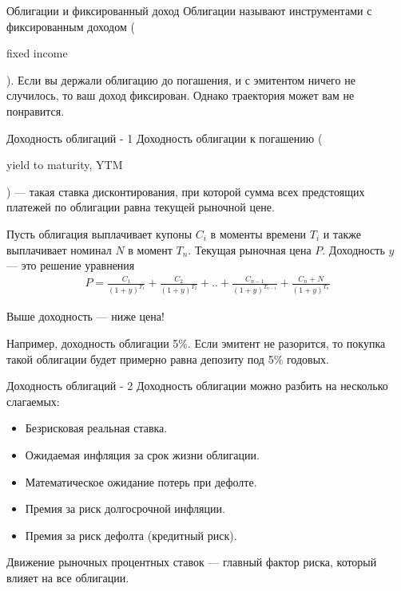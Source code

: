 \documentclass{beamer}
\newcommand{\en}[1]{\begin{otherlanguage}{english}#1\end{otherlanguage}}
\begin{document}
\begin{frame}{Облигации и фиксированный доход}
\justify
Облигации называют инструментами с фиксированным доходом (\en{fixed 
income}). Если вы держали облигацию до погашения, и с эмитентом ничего
не случилось, то ваш доход фиксирован. Однако траектория может вам не 
понравится.

\centering
{}
\end{frame}



\begin{frame}{Доходность облигаций - 1}
\justify
Доходность облигации к погашению (\en{yield to maturity, YTM}) --- такая ставка 
дисконтирования, при которой сумма всех предстоящих платежей по облигации
равна текущей рыночной цене.

\justify
Пусть облигация выплачивает купоны $C_i$ в моменты времени $T_i$ и также 
выплачивает номинал $N$ в момент $T_n$. Текущая рыночная цена $P$. Доходность
$y$ --- это решение уравнения
\begin{align*}
P = \frac{C_1}{(1+y)^{T_1}} + \frac{C_2}{(1+y)^{T_2}}
+ .. + \frac{C_{n-1}}{(1+y)^{T_{n-1}}} + \frac{C_n + N}{(1+y)^{T_n}}
\end{align*}

\justify
Выше доходность --- ниже цена!

\justify
Например, доходность облигации 5\%. Если эмитент не разорится, то покупка такой 
облигации будет примерно равна депозиту под 5\% годовых.
\end{frame}



\begin{frame}{Доходность облигаций - 2}
\justify
Доходность облигации можно разбить на несколько слагаемых:
\begin{itemize}
\item Безрисковая реальная ставка.
\item Ожидаемая инфляция за срок жизни облигации.
\item Математическое ожидание потерь при дефолте.
\item Премия за риск долгосрочной инфляции.
\item Премия за риск дефолта (кредитный риск).
\end{itemize}

\justify
Движение рыночных процентных ставок --- главный фактор риска, который влияет
на все облигации.
\end{frame}
\end{document}
